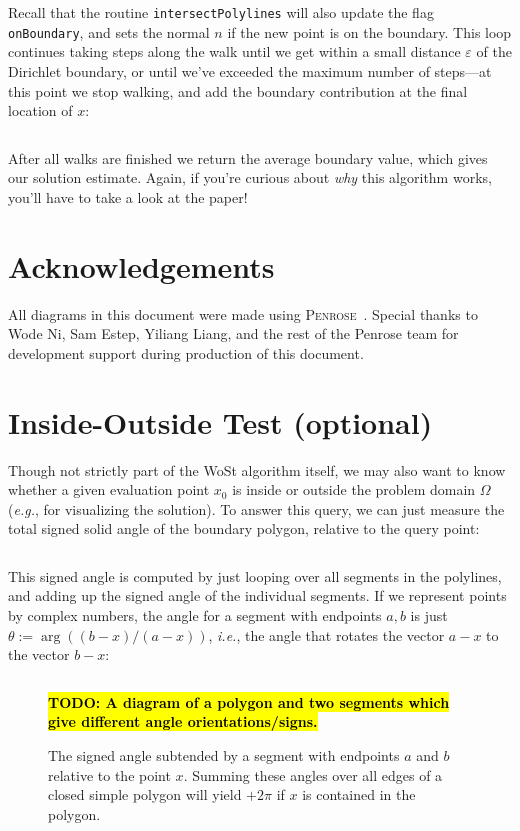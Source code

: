 \documentclass{article}
\newcommand{\code}[1]{\texttt{\small{#1}}}
\newcommand{\todo}[1]{\textbf{\hl{TODO: #1}}}
\newcommand{\eg}{\emph{e.g.}} %
\newcommand{\ie}{\emph{i.e.}} %
\renewcommand{\vec}[1]{#1}
\begin{document}
Recall that the routine \code{intersectPolylines} will also update the flag \code{onBoundary}, and sets the normal \(n\) if the new point is on the boundary.  This loop continues taking steps along the walk until we get within a small distance \(\varepsilon\) of the Dirichlet boundary, or until we've exceeded the maximum number of steps---at this point we stop walking, and add the boundary contribution at the final location of \(\vec{x}\):

\inputminted[fontsize=\small,linenos,firstline=151,lastline=159,bgcolor=bg]{cpp}{../code/WoStLaplace2D.cpp}

After all walks are finished we return the average boundary value, which gives our solution estimate.  Again, if you're curious about \emph{why} this algorithm works, you'll have to take a look at the paper!

\section*{Acknowledgements} All diagrams in this document were made using \textsc{Penrose}~\citep{Ye:2020:PFM}.  Special thanks to Wode Ni, Sam Estep, Yiliang Liang, and the rest of the Penrose team for development support during production of this document.




\appendix

\section{Inside-Outside Test (optional)}
\label{sec:InsideOutsideTest}

Though not strictly part of the WoSt algorithm itself, we may also want to know whether a given evaluation point \(\vec{x}_0\) is inside or outside the problem domain \(\Omega\) (\eg, for visualizing the solution).  To answer this query, we can just measure the total signed solid angle of the boundary polygon, relative to the query point:

\inputminted[fontsize=\small,linenos,firstline=187,lastline=198,bgcolor=bg]{cpp}{../code/WoStLaplace2D.cpp}

This signed angle is computed by just looping over all segments in the polylines, and adding up the signed angle of the individual segments.  If we represent points by complex numbers, the angle for a segment with endpoints \(\vec{a},\vec{b}\) is just \(\theta := \arg((\vec{b}-\vec{x})/(\vec{a}-\vec{x}))\), \ie, the angle that rotates the vector \(\vec{a}-\vec{x}\) to the vector \(\vec{b}-\vec{x}\):

\inputminted[fontsize=\small,linenos,firstline=176,lastline=185,bgcolor=bg]{cpp}{../code/WoStLaplace2D.cpp}

\begin{figure}[h!]
   \todo{A diagram of a polygon and two segments which give different angle orientations/signs.}
   \caption{The signed angle subtended by a segment with endpoints \(\vec{a}\) and \(\vec{b}\) relative to the point \(\vec{x}\).  Summing these angles over all edges of a closed simple polygon will yield \(+2\pi\) if \(\vec{x}\) is contained in the polygon.}
\end{figure}
\end{document}

